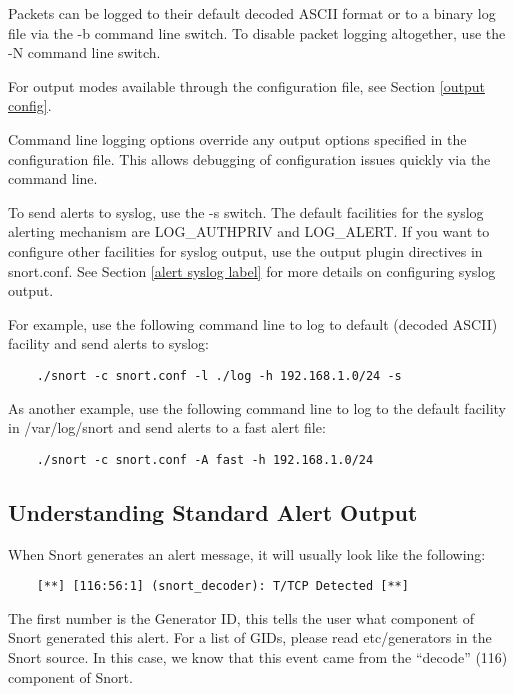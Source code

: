 \documentclass[english]{report}
\newenvironment{note}{
\samepage
    \vspace{10pt}{\textsf{
        {\hspace{7pt}\Huge{$\triangle$\hspace{-12.5pt}{\Large{$^!$}}}}\hspace{5pt}
        {\Large{NOTE}}
    }
    }
   \begin{center}
    \par\vspace{-17pt}

    \begin{lrbox}{\savepar}
    \begin{minipage}[r]{6in}
}
{
    \end{minipage}
    \end{lrbox}
    \fbox{
        \usebox{
            \savepar
	}
    }
    \par\vskip10pt
    \end{center}
}
\newenvironment{note}{
        \begin{rawhtml}
        <p><table border="1"><tr><td><b>
        Note:&nbsp;&nbsp;</b>
        \end{rawhtml}
}{
        \begin{rawhtml}
        </b></td></tr></table></p>
        \end{rawhtml}
}
\begin{document}
Packets can be logged to their default decoded ASCII format or to a binary log
file via the -b command line switch. To disable packet logging altogether, use
the -N command line switch.

For output modes available through the configuration file, see Section
\ref{output config}.

\begin{note}

Command line logging options override any output options specified in the
configuration file. This allows debugging of configuration issues quickly via
the command line.

\end{note}

To send alerts to syslog, use the -s switch. The default facilities for the
syslog alerting mechanism are LOG\_AUTHPRIV and LOG\_ALERT.  If you want to
configure other facilities for syslog output, use the output plugin directives
in snort.conf. See Section \ref{alert syslog label} for more details on
configuring syslog output.

For example, use the following command line to log to default (decoded ASCII)
facility and send alerts to syslog: 

\begin{verbatim}
    ./snort -c snort.conf -l ./log -h 192.168.1.0/24 -s
\end{verbatim}

As another example, use the following command line to log to the default
facility in /var/log/snort and send alerts to a fast alert file: 

\begin{verbatim}
    ./snort -c snort.conf -A fast -h 192.168.1.0/24
\end{verbatim}

\subsection{Understanding Standard Alert Output}

When Snort generates an alert message, it will usually look like the following:
 
\begin{verbatim}	 
    [**] [116:56:1] (snort_decoder): T/TCP Detected [**]
\end{verbatim}
  	 
The first number is the Generator ID, this tells the user what component of
Snort generated this alert. For a list of GIDs, please read etc/generators in
the Snort source. In this case, we know that this event came from the
``decode'' (116) component of Snort.
  	 
\end{document}
